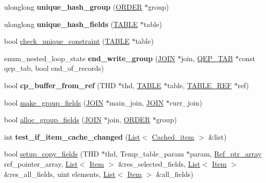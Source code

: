 \begin{DoxyCompactItemize}
\mbox{\label{group__Query__Executor_ga0d5b7476da75f3e6068a960995ac3313}} 
ulonglong {\bfseries unique\+\_\+hash\+\_\+group} (\mbox{\hyperlink{structst__order}{O\+R\+D\+ER}} $\ast$group)
\item 
\mbox{\label{group__Query__Executor_ga93219e97760f167554f60d019f3cb11f}} 
ulonglong {\bfseries unique\+\_\+hash\+\_\+fields} (\mbox{\hyperlink{structTABLE}{T\+A\+B\+LE}} $\ast$table)
\item 
bool \mbox{\hyperlink{group__Query__Executor_ga90a4e0bf6e706b42c25d6649e105bd87}{check\+\_\+unique\+\_\+constraint}} (\mbox{\hyperlink{structTABLE}{T\+A\+B\+LE}} $\ast$table)
\item 
\mbox{\label{group__Query__Executor_ga0ba03c58c23ec2df563b37709e40ece2}} 
enum\+\_\+nested\+\_\+loop\+\_\+state {\bfseries end\+\_\+write\+\_\+group} (\mbox{\hyperlink{classJOIN}{J\+O\+IN}} $\ast$join, \mbox{\hyperlink{classQEP__TAB}{Q\+E\+P\+\_\+\+T\+AB}} $\ast$const qep\+\_\+tab, bool end\+\_\+of\+\_\+records)
\item 
\mbox{\label{group__Query__Executor_ga8ce1ad15977cc2105276ffca627a3824}} 
bool {\bfseries cp\+\_\+buffer\+\_\+from\+\_\+ref} (T\+HD $\ast$thd, \mbox{\hyperlink{structTABLE}{T\+A\+B\+LE}} $\ast$table, \mbox{\hyperlink{structst__table__ref}{T\+A\+B\+L\+E\+\_\+\+R\+EF}} $\ast$ref)
\item 
bool \mbox{\hyperlink{group__Query__Executor_gaa0bd2dbcf106da50227e2eb4932b588d}{make\+\_\+group\+\_\+fields}} (\mbox{\hyperlink{classJOIN}{J\+O\+IN}} $\ast$main\+\_\+join, \mbox{\hyperlink{classJOIN}{J\+O\+IN}} $\ast$curr\+\_\+join)
\item 
bool \mbox{\hyperlink{group__Query__Executor_ga108fbed43151ab58878335fbb84503c1}{alloc\+\_\+group\+\_\+fields}} (\mbox{\hyperlink{classJOIN}{J\+O\+IN}} $\ast$join, \mbox{\hyperlink{structst__order}{O\+R\+D\+ER}} $\ast$group)
\item 
\mbox{\label{group__Query__Executor_ga1389fe70c557f844809a7bd780fc545a}} 
int {\bfseries test\+\_\+if\+\_\+item\+\_\+cache\+\_\+changed} (\mbox{\hyperlink{classList}{List}}$<$ \mbox{\hyperlink{classCached__item}{Cached\+\_\+item}} $>$ \&list)
\item 
bool \mbox{\hyperlink{group__Query__Executor_gaea6e7f59b9cca648046cf55fe5a95732}{setup\+\_\+copy\+\_\+fields}} (T\+HD $\ast$thd, Temp\+\_\+table\+\_\+param $\ast$param, \mbox{\hyperlink{classBounds__checked__array}{Ref\+\_\+ptr\+\_\+array}} ref\+\_\+pointer\+\_\+array, \mbox{\hyperlink{classList}{List}}$<$ \mbox{\hyperlink{classItem}{Item}} $>$ \&res\+\_\+selected\+\_\+fields, \mbox{\hyperlink{classList}{List}}$<$ \mbox{\hyperlink{classItem}{Item}} $>$ \&res\+\_\+all\+\_\+fields, uint elements, \mbox{\hyperlink{classList}{List}}$<$ \mbox{\hyperlink{classItem}{Item}} $>$ \&all\+\_\+fields)

\end{DoxyCompactItemize}
